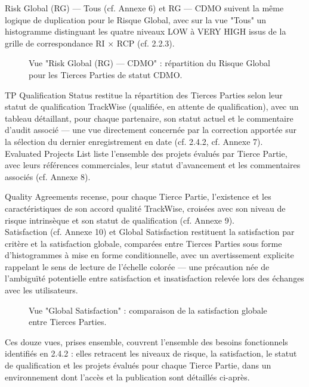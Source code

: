 Risk Global (RG) — Tous (cf. Annexe 6) et RG — CDMO suivent la même logique de 
duplication pour le Risque Global, avec sur la vue "Tous" un histogramme distinguant 
les quatre niveaux LOW à VERY HIGH issus de la grille de correspondance RI × RCP 
(cf. 2.2.3). 
 
\begin{figure}[H]
    \centering
    \caption{Vue "Risk Global (RG) — CDMO" : répartition du Risque Global pour les Tierces Parties de statut CDMO.}
    \label{Vue_Risk_Global_(RG)_CDMO}
\end{figure}

TP Qualification Status restitue la répartition des Tierces Parties selon leur statut de 
qualification TrackWise (qualifiée, en attente de qualification), avec un tableau 
détaillant, pour chaque partenaire, son statut actuel et le commentaire d'audit associé 
— une vue directement concernée par la correction apportée sur la sélection du dernier 
enregistrement en date (cf. 2.4.2, cf. Annexe 7). \\

Evaluated Projects List liste l'ensemble des projets évalués par Tierce Partie, avec leurs 
références commerciales, leur statut d'avancement et les commentaires associés (cf. 
Annexe 8).

Quality Agreements recense, pour chaque Tierce Partie, l'existence et les 
caractéristiques de son accord qualité TrackWise, croisées avec son niveau de risque 
intrinsèque et son statut de qualification (cf. Annexe 9). \\

Satisfaction (cf. Annexe 10) et Global Satisfaction restituent la satisfaction par critère et 
la satisfaction globale, comparées entre Tierces Parties sous forme d'histogrammes à 
mise en forme conditionnelle, avec un avertissement explicite rappelant le sens de 
lecture de l'échelle colorée — une précaution née de l'ambiguïté potentielle entre 
satisfaction et insatisfaction relevée lors des échanges avec les utilisateurs. 

\begin{figure}[H]
    \centering
    \caption{Vue "Global Satisfaction" : comparaison de la satisfaction globale entre Tierces Parties.}
    \label{Vue_Global_Satisfaction}
\end{figure}

Ces douze vues, prises ensemble, couvrent l'ensemble des besoins fonctionnels 
identifiés en 2.4.2 : elles retracent les niveaux de risque, la satisfaction, le statut de 
qualification et les projets évalués pour chaque Tierce Partie, dans un environnement 
dont l'accès et la publication sont détaillés ci-après.

